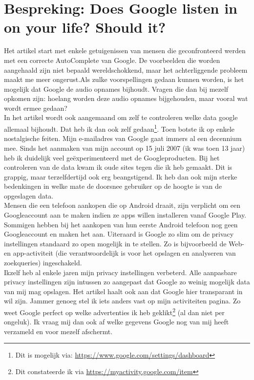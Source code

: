 \documentclass[11pt]{article}
\author{Jasper De Valck}
\begin{document}
\section*{Bespreking: Does Google listen in on your life? Should it?}
Het artikel start met enkele getuigenissen van mensen die geconfronteerd werden met een correcte AutoComplete van Google. De voorbeelden die worden aangehaald zijn niet bepaald wereldschokkend, maar het achterliggende probleem maakt me meer ongerust.Als zulke voorspellingen gedaan kunnen worden, is het mogelijk dat Google de audio opnames bijhoudt. Vragen die dan bij mezelf opkomen zijn: hoelang worden deze audio opnames bijgehouden, maar vooral wat wordt ermee gedaan?\\

In het artikel wordt ook aangemaand om zelf te controleren welke data google allemaal bijhoudt. Dat heb ik dan ook zelf gedaan\footnote{Dit is mogelijk via: \url{https://www.google.com/settings/dashboard}}. Toen botste ik op enkele nostalgische feiten. Mijn e-mailadres van Google gaat immers al een decennium mee. Sinds het aanmaken van mijn account op 15 juli 2007 (ik was toen 13 jaar) heb ik duidelijk veel ge\"{e}xperimenteerd met de Googleproducten. Bij het controleren van de data kwam ik oude sites tegen die ik heb gemaakt. Dit is grappig, maar terzelfdertijd ook erg beangstigend. Ik heb dan ook mijn sterke bedenkingen in welke mate de doorsnee gebruiker op de hoogte is van de opgeslagen data.\\

Mensen die een telefoon aankopen die op Android draait, zijn verplicht om een Googleaccount aan te maken indien ze apps willen installeren vanaf Google Play. Sommigen hebben bij het aankopen van hun eerste Android telefoon nog geen Googleaccount en maken het aan. Uiteraard is Google zo slim om de privacy instellingen standaard zo open mogelijk in te stellen. Zo is bijvoorbeeld de Web- en app-activiteit (die verantwoordelijk is voor het opslagen en analyseren van zoekqueries) ingeschakeld.\\

Ikzelf heb al enkele jaren mijn privacy instellingen verbeterd. Alle aanpasbare privacy instellingen zijn intussen zo aangepast dat Google zo weinig mogelijk data van mij mag opslagen. Het artikel haalt ook aan dat Google hier transparant in wil zijn. Jammer genoeg stel ik iets anders vast op mijn activiteiten pagina. Zo weet Google perfect op welke advertenties ik heb geklikt\footnote{Dit constateerde ik via \url{https://myactivity.google.com/item}} (al dan niet per ongeluk). Ik vraag mij dan ook af welke gegevens Google nog van mij heeft verzameld en voor mezelf afschermt.
\end{document}

